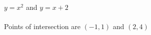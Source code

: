 {$y=x^2$ and $y=x+2$}
{\text{}\\ \label{fig:02_04_ex_20} \\
Points of intersection are $(-1,1)$ and $(2,4)$}
